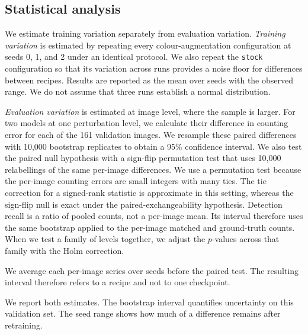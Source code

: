 \subsection{Statistical analysis}
\label{sec:stats}

We estimate training variation separately from evaluation variation.
\emph{Training variation} is estimated by repeating every colour-augmentation
configuration at seeds 0, 1, and 2 under an identical protocol. We also repeat
the \texttt{stock} configuration so that its variation across runs provides a
noise floor for differences between recipes. Results are reported as the mean
over seeds with the observed range. We do not assume that three runs establish
a normal distribution.

\emph{Evaluation variation} is estimated at image level, where the sample is
larger. For two models at one perturbation level, we calculate their difference
in counting error for each of the 161 validation images. We resample these
paired differences with 10{,}000 bootstrap replicates to obtain a 95\%
confidence interval. We also test the paired null hypothesis with a sign-flip
permutation test that uses 10{,}000 relabellings of the same per-image
differences. We use a permutation test because the per-image counting errors
are small integers with many ties. The tie correction for a signed-rank
statistic is approximate in this setting, whereas the sign-flip null is exact
under the paired-exchangeability hypothesis. Detection recall is a ratio of
pooled counts, not a per-image mean. Its interval therefore uses the same
bootstrap applied to the per-image matched and ground-truth counts. When we test
a family of levels together, we adjust the $p$-values across that family with
the Holm correction.

We average each per-image series over seeds before the paired test. The
resulting interval therefore refers to a recipe and not to one checkpoint.

We report both estimates. The bootstrap interval quantifies uncertainty on this
validation set. The seed range shows how much of a difference remains after
retraining.
